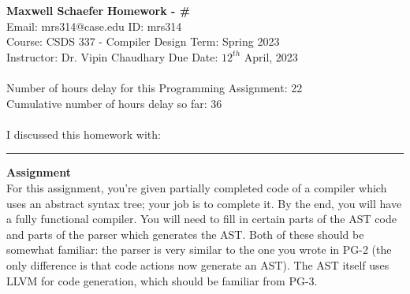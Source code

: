 \documentclass[a4paper, 11pt]{article}
\begin{document}
\noindent
\large\textbf{Maxwell Schaefer} \hfill \textbf{Homework - \#}   \\
Email: mrs314@case.edu \hfill ID: mrs314 \\
\normalsize Course: CSDS 337 - Compiler Design \hfill Term: Spring 2023\\
Instructor: Dr. Vipin Chaudhary \hfill Due Date: $12^{th}$ April, 2023 \\ \\
Number of hours delay for this Programming Assignment: \hfill 22\\
Cumulative number of hours delay so far: \hfill 36 \\ \\
I discussed this homework with: \hfill  \\
\noindent\rule{7in}{2.8pt}



\large\textbf{Assignment} \\
For this assignment, you're given partially completed code of a compiler which uses an abstract syntax tree; your job is to complete it. By the end, you will have a fully functional compiler. You will need to fill in certain parts of the AST code and parts of the parser which generates the AST. Both of these should be somewhat familiar: the parser is very similar to the one you wrote in PG-2 (the only difference is that code actions now generate an AST). The AST itself uses LLVM for code generation, which should be familiar from PG-3.
\end{document}
